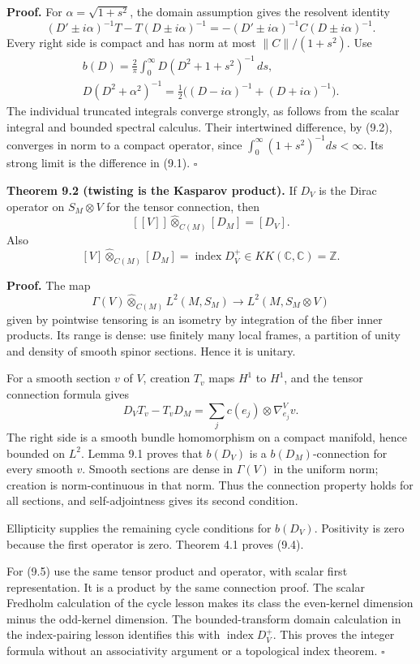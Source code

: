 \documentclass[
  11pt,
]{article}
\begin{document}
\textbf{Proof.} For \(\alpha=\sqrt{1+s^2}\), the domain assumption gives
the resolvent identity \[
(D'\pm i\alpha)^{-1}T-T(D\pm i\alpha)^{-1}
=-(D'\pm i\alpha)^{-1}C(D\pm i\alpha)^{-1}.
\tag{9.2}
\] Every right side is compact and has norm at most \(\|C\|/(1+s^2)\).
Use \[
\begin{gathered}
b(D)=\frac2\pi\int_0^\infty D(D^2+1+s^2)^{-1}\,ds,\\
D(D^2+\alpha^2)^{-1}
=\frac12\bigl((D-i\alpha)^{-1}+(D+i\alpha)^{-1}\bigr).
\end{gathered}
\tag{9.3}
\] The individual truncated integrals converge strongly, as follows from
the scalar integral and bounded spectral calculus. Their intertwined
difference, by (9.2), converges in norm to a compact operator, since
\(\int_0^\infty(1+s^2)^{-1}ds<\infty\). Its strong limit is the
difference in (9.1). \(\square\)

\textbf{Theorem 9.2 (twisting is the Kasparov product).} If \(D_V\) is
the Dirac operator on \(S_M\otimes V\) for the tensor connection, then
\[
[[V]]\widehat\otimes_{C(M)}[D_M]=[D_V].
\tag{9.4}
\] Also \[
[V]\widehat\otimes_{C(M)}[D_M]
=\operatorname{index}D_V^+\in KK(\mathbb C,\mathbb C)=\mathbb Z.
\tag{9.5}
\]

\textbf{Proof.} The map \[
\Gamma(V)\widehat\otimes_{C(M)}L^2(M,S_M)
\longrightarrow L^2(M,S_M\otimes V)
\] given by pointwise tensoring is an isometry by integration of the
fiber inner products. Its range is dense: use finitely many local
frames, a partition of unity and density of smooth spinor sections.
Hence it is unitary.

For a smooth section \(v\) of \(V\), creation \(T_v\) maps \(H^1\) to
\(H^1\), and the tensor connection formula gives \[
D_VT_v-T_vD_M
=\sum_j c(e_j)\otimes\nabla^V_{e_j}v.
\tag{9.6}
\] The right side is a smooth bundle homomorphism on a compact manifold,
hence bounded on \(L^2\). Lemma 9.1 proves that \(b(D_V)\) is a
\(b(D_M)\)-connection for every smooth \(v\). Smooth sections are dense
in \(\Gamma(V)\) in the uniform norm; creation is norm-continuous in
that norm. Thus the connection property holds for all sections, and
self-adjointness gives its second condition.

Ellipticity supplies the remaining cycle conditions for \(b(D_V)\).
Positivity is zero because the first operator is zero. Theorem 4.1
proves (9.4).

For (9.5) use the same tensor product and operator, with scalar first
representation. It is a product by the same connection proof. The scalar
Fredholm calculation of the cycle lesson makes its class the even-kernel
dimension minus the odd-kernel dimension. The bounded-transform domain
calculation in the index-pairing lesson identifies this with
\(\operatorname{index}D_V^+\). This proves the integer formula without
an associativity argument or a topological index theorem. \(\square\)
\end{document}
